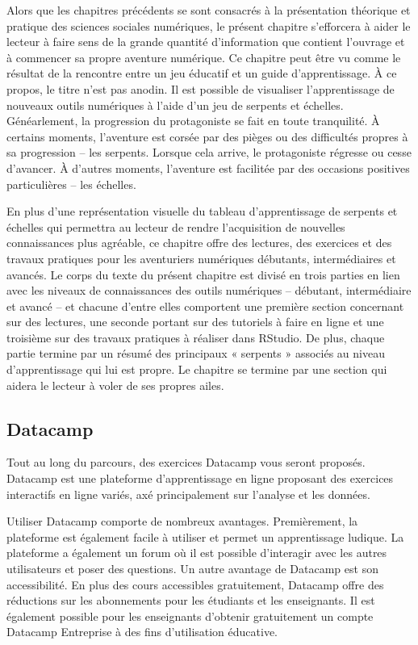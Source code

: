 \documentclass[
  letterpaper,
]{scrbook}
\begin{document}
Alors que les chapitres précédents se sont consacrés à la présentation
théorique et pratique des sciences sociales numériques, le présent
chapitre s'efforcera à aider le lecteur à faire sens de la grande
quantité d'information que contient l'ouvrage et à commencer sa propre
aventure numérique. Ce chapitre peut être vu comme le résultat de la
rencontre entre un jeu éducatif et un guide d'apprentissage. À ce
propos, le titre n'est pas anodin. Il est possible de visualiser
l'apprentissage de nouveaux outils numériques à l'aide d'un jeu de
serpents et échelles. Généarlement, la progression du protagoniste se
fait en toute tranquilité. À certains moments, l'aventure est corsée par
des pièges ou des difficultés propres à sa progression -- les serpents.
Lorsque cela arrive, le protagoniste régresse ou cesse d'avancer. À
d'autres moments, l'aventure est facilitée par des occasions positives
particulières -- les échelles.

En plus d'une représentation visuelle du tableau d'apprentissage de
serpents et échelles qui permettra au lecteur de rendre l'acquisition de
nouvelles connaissances plus agréable, ce chapitre offre des lectures,
des exercices et des travaux pratiques pour les aventuriers numériques
débutants, intermédiaires et avancés. Le corps du texte du présent
chapitre est divisé en trois parties en lien avec les niveaux de
connaissances des outils numériques -- débutant, intermédiaire et avancé
-- et chacune d'entre elles comportent une première section concernant
sur des lectures, une seconde portant sur des tutoriels à faire en ligne
et une troisième sur des travaux pratiques à réaliser dans RStudio. De
plus, chaque partie termine par un résumé des principaux « serpents »
associés au niveau d'apprentissage qui lui est propre. Le chapitre se
termine par une section qui aidera le lecteur à voler de ses propres
ailes.

\hypertarget{datacamp}{%
\subsection{Datacamp}\label{datacamp}}

Tout au long du parcours, des exercices Datacamp vous seront proposés.
Datacamp est une plateforme d'apprentissage en ligne proposant des
exercices interactifs en ligne variés, axé principalement sur l'analyse
et les données.

Utiliser Datacamp comporte de nombreux avantages. Premièrement, la
plateforme est également facile à utiliser et permet un apprentissage
ludique. La plateforme a également un forum où il est possible
d'interagir avec les autres utilisateurs et poser des questions. Un
autre avantage de Datacamp est son accessibilité. En plus des cours
accessibles gratuitement, Datacamp offre des réductions sur les
abonnements pour les étudiants et les enseignants. Il est également
possible pour les enseignants d'obtenir gratuitement un compte Datacamp
Entreprise à des fins d'utilisation éducative.
\end{document}
